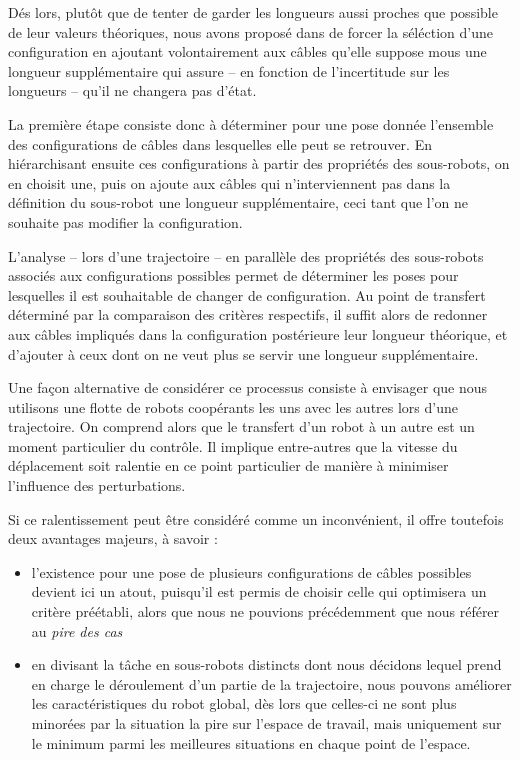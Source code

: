 D\'es lors, plut\^ot que de tenter de garder les longueurs aussi proches 
que possible de leur valeurs th\'eoriques, nous avons propos\'e 
dans \cite{ramadour2014} de forcer la s\'el\'ection d'une configuration en 
ajoutant volontairement aux c\^ables qu'elle suppose mous une longueur 
suppl\'ementaire qui assure -- en fonction de l'incertitude sur les longueurs 
-- qu'il ne changera pas d'\'etat.

La premi\`ere \'etape consiste donc \`a d\'eterminer pour une pose donn\'ee 
l'en\-semble des configurations de c\^ables dans lesquelles elle peut se 
retrouver. En hi\'erar\-chisant ensuite ces configurations \`a partir des 
propri\'et\'es des sous-robots, on en choisit une, puis on ajoute aux 
c\^ables qui n'interviennent pas dans la d\'efinition du sous-robot une 
longueur suppl\'ementaire, ceci tant que l'on ne souhaite pas modifier la 
configuration.

L'analyse -- lors d'une trajectoire -- en parall\`ele des propri\'et\'es des 
sous-robots associ\'es aux configurations possibles permet de d\'eterminer les 
poses pour lesquelles il est souhaitable de changer de configuration. Au point 
de transfert d\'etermin\'e par la comparaison des crit\`eres respectifs, il 
suffit alors de redonner aux c\^ables impliqu\'es dans la configuration 
post\'erieure leur longueur th\'eorique, et d'ajouter \`a ceux dont on ne veut 
plus se servir une longueur suppl\'ementaire.

Une fa\c con alternative de consid\'erer ce processus consiste \`a envisager 
que nous utilisons une flotte de robots coop\'erants les uns avec les autres 
lors d'une trajectoire. On comprend alors que le transfert d'un robot \`a un 
autre est un moment particulier du contr\^ole. Il implique entre-autres que la 
vitesse du d\'eplacement soit ralentie en ce point particulier de mani\`ere \`a 
minimiser l'influence des perturbations.

Si ce ralentissement peut \^etre consid\'er\'e comme un inconv\'enient, 
il offre toutefois deux avantages majeurs, \`a savoir :
\begin{itemize}
 \item l'existence pour une pose de plusieurs configurations de c\^ables 
possibles devient ici un atout, puisqu'il est permis de choisir celle qui 
optimisera un crit\`ere pr\'e\'etabli, alors que nous ne pouvions 
pr\'ec\'edemment que nous r\'ef\'erer au {\it pire des cas}
  \item en divisant la t\^ache en sous-robots distincts dont nous d\'ecidons 
lequel prend en charge le d\'eroulement d'un partie de la trajectoire, nous 
pouvons am\'eliorer les caract\'eristiques du robot global, d\`es lors que 
celles-ci ne sont plus minor\'ees par la situation la pire sur l'espace de 
travail, mais uniquement sur le minimum parmi les meilleures situations en 
chaque point de l'espace.
\end{itemize}

